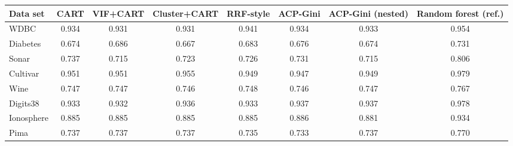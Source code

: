 \begin{tabular}{lccccccc}
\toprule
Data set & CART & VIF+CART & Cluster+CART & RRF-style & ACP-Gini & ACP-Gini (nested) & Random forest (ref.) \\
\midrule
WDBC & 0.934 & 0.931 & 0.931 & 0.941 & 0.934 & 0.933 & 0.954 \\
Diabetes & 0.674 & 0.686 & 0.667 & 0.683 & 0.676 & 0.674 & 0.731 \\
Sonar & 0.737 & 0.715 & 0.723 & 0.726 & 0.731 & 0.715 & 0.806 \\
Cultivar & 0.951 & 0.951 & 0.955 & 0.949 & 0.947 & 0.949 & 0.979 \\
Wine & 0.747 & 0.747 & 0.746 & 0.748 & 0.746 & 0.747 & 0.767 \\
Digits38 & 0.933 & 0.932 & 0.936 & 0.933 & 0.937 & 0.937 & 0.978 \\
Ionosphere & 0.885 & 0.885 & 0.885 & 0.885 & 0.886 & 0.881 & 0.934 \\
Pima & 0.737 & 0.737 & 0.737 & 0.735 & 0.733 & 0.737 & 0.770 \\
\bottomrule
\end{tabular}
